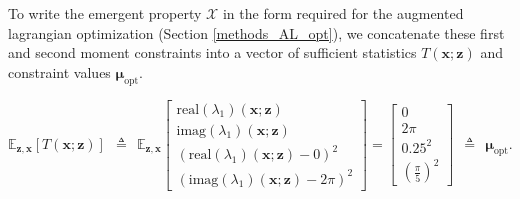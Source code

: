 \documentclass[11pt]{article}
\begin{document}
To write the emergent property $\mathcal{X}$ in the form required for the augmented lagrangian optimization (Section \ref{methods_AL_opt}), we concatenate these first and second moment constraints into a vector of sufficient statistics $T(\mathbf{x}; \mathbf{z})$ and constraint values $\bm{\mu}_{\text{opt}}$.

\begin{equation}
 \mathbb{E}_{\mathbf{z}, \mathbf{x}} \left[T(\mathbf{x}; \mathbf{z}) \right] ~~ \triangleq ~~ \mathbb{E}_{\mathbf{z}, \mathbf{x}}  \begin{bmatrix} \text{real}(\lambda_1)(\mathbf{x}; \mathbf{z}) \\ \text{imag}(\lambda_1)(\mathbf{x}; \mathbf{z}) \\ (\text{real}(\lambda_1)(\mathbf{x}; \mathbf{z})-0)^2  \\ (\text{imag}(\lambda_1)(\mathbf{x}; \mathbf{z})-2 \pi)^2 \end{bmatrix} = \begin{bmatrix} 0 \\ 2 \pi \\ 0.25^2 \\ (\frac{\pi}{5})^2 \end{bmatrix} ~~ \triangleq ~~ \bm{\mu}_{\text{opt}}.
 \end{equation} 
\end{document}
